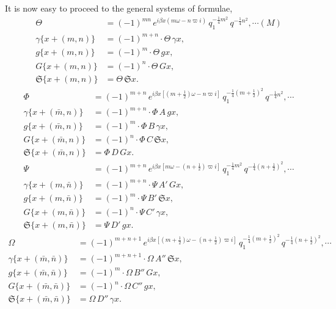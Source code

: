 \documentclass[12pt,a4paper]{article}
\newcommand{\fS}{\mathfrak{S}}
\newcommand{\mn}{(m,n)}
\newcommand{\mbn}{(\bar m,n)}
\newcommand{\mnb}{(m,\bar n)}
\newcommand{\mbnb}{(\bar m,\bar n)}
\begin{document}
It is now easy to proceed to the general systems of formulae,
\begin{align*}
\Theta &= (-1)^{mn}\,e^{i\beta x(m\omega - n\varpi i)}\,q_1^{-\frac{1}{4}m^2}\,q^{-\frac{1}{4}n^2}, \cdots(M)\\
\gamma\{x + \mn\} &= (-1)^{m+n}\cdot\Theta\,\gamma x,\\
g\{x + \mn\} &= (-1)^m \cdot\Theta\,g x,\\
G\{x + \mn\} &= (-1)^n \cdot\Theta\,G x,\\
\fS\{x + \mn\} &= \Theta\,\fS x.
\end{align*}
\begin{align*}
\Phi &= (-1)^{m+n}\,e^{i\beta x[(m+\frac{1}{2})\omega - n\varpi i]}\,q_1^{-\frac{1}{4}(m+\frac{1}{2})^2}\,q^{-\frac{1}{4}n^2}, \cdots\\
\gamma\{x + \mbn\} &= (-1)^{m+n}\cdot\Phi\,A\,g x,\\
g\{x + \mbn\} &= (-1)^m \cdot\Phi\,B\,\gamma x,\\
G\{x + \mbn\} &= (-1)^n \cdot\Phi\,C\,\fS x,\\
\fS\{x + \mbn\} &= \Phi\,D\,G x.
\end{align*}
\begin{align*}
\Psi &= (-1)^{m+n}\,e^{i\beta x[m\omega - (n+\frac{1}{2})\varpi i]}\,q_1^{-\frac{1}{4}m^2}\,q^{-\frac{1}{4}(n+\frac{1}{2})^2}, \cdots\\
\gamma\{x + \mnb\} &= (-1)^{m+n}\cdot\Psi\,A'\,G x,\\
g\{x + \mnb\} &= (-1)^m \cdot\Psi\,B'\,\fS x,\\
G\{x + \mnb\} &= (-1)^n \cdot\Psi\,C'\,\gamma x,\\
\fS\{x + \mnb\} &= \Psi\,D'\,g x.
\end{align*}
\begin{align*}
\Omega &= (-1)^{m+n+1}\,e^{i\beta x[(m+\frac{1}{2})\omega - (n+\frac{1}{2})\varpi i]}\,q_1^{-\frac{1}{4}(m+\frac{1}{2})^2}\,q^{-\frac{1}{4}(n+\frac{1}{2})^2}, \cdots\\
\gamma\{x + \mbnb\} &= (-1)^{m+n+1}\cdot\Omega\,A''\,\fS x,\\
g\{x + \mbnb\} &= (-1)^m \cdot\Omega\,B''\,G x,\\
G\{x + \mbnb\} &= (-1)^n \cdot\Omega\,C''\,g x,\\
\fS\{x + \mbnb\} &= \Omega\,D''\,\gamma x.
\end{align*}

\newpage
\setcounter{page}{145}
\end{document}
